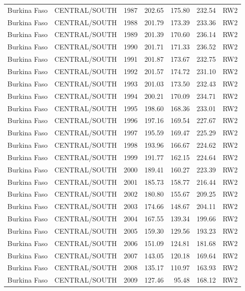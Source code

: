 \begin{longtable}{lllrrrl}
  Burkina Faso & CENTRAL/SOUTH & 1987 & 202.65 & 175.80 & 232.54 & RW2 \\ 
  Burkina Faso & CENTRAL/SOUTH & 1988 & 201.79 & 173.39 & 233.36 & RW2 \\ 
  Burkina Faso & CENTRAL/SOUTH & 1989 & 201.39 & 170.60 & 236.14 & RW2 \\ 
  Burkina Faso & CENTRAL/SOUTH & 1990 & 201.71 & 171.33 & 236.52 & RW2 \\ 
  Burkina Faso & CENTRAL/SOUTH & 1991 & 201.87 & 173.67 & 232.75 & RW2 \\ 
  Burkina Faso & CENTRAL/SOUTH & 1992 & 201.57 & 174.72 & 231.10 & RW2 \\ 
  Burkina Faso & CENTRAL/SOUTH & 1993 & 201.03 & 173.50 & 232.43 & RW2 \\ 
  Burkina Faso & CENTRAL/SOUTH & 1994 & 200.21 & 170.09 & 234.71 & RW2 \\ 
  Burkina Faso & CENTRAL/SOUTH & 1995 & 198.60 & 168.36 & 233.01 & RW2 \\ 
  Burkina Faso & CENTRAL/SOUTH & 1996 & 197.16 & 169.54 & 227.67 & RW2 \\ 
  Burkina Faso & CENTRAL/SOUTH & 1997 & 195.59 & 169.47 & 225.29 & RW2 \\ 
  Burkina Faso & CENTRAL/SOUTH & 1998 & 193.96 & 166.67 & 224.62 & RW2 \\ 
  Burkina Faso & CENTRAL/SOUTH & 1999 & 191.77 & 162.15 & 224.64 & RW2 \\ 
  Burkina Faso & CENTRAL/SOUTH & 2000 & 189.41 & 160.27 & 223.39 & RW2 \\ 
  Burkina Faso & CENTRAL/SOUTH & 2001 & 185.73 & 158.77 & 216.44 & RW2 \\ 
  Burkina Faso & CENTRAL/SOUTH & 2002 & 180.80 & 155.67 & 209.25 & RW2 \\ 
  Burkina Faso & CENTRAL/SOUTH & 2003 & 174.66 & 148.67 & 204.11 & RW2 \\ 
  Burkina Faso & CENTRAL/SOUTH & 2004 & 167.55 & 139.34 & 199.66 & RW2 \\ 
  Burkina Faso & CENTRAL/SOUTH & 2005 & 159.30 & 129.56 & 193.23 & RW2 \\ 
  Burkina Faso & CENTRAL/SOUTH & 2006 & 151.09 & 124.81 & 181.68 & RW2 \\ 
  Burkina Faso & CENTRAL/SOUTH & 2007 & 143.05 & 120.18 & 169.64 & RW2 \\ 
  Burkina Faso & CENTRAL/SOUTH & 2008 & 135.17 & 110.97 & 163.93 & RW2 \\ 
  Burkina Faso & CENTRAL/SOUTH & 2009 & 127.46 & 95.48 & 168.12 & RW2 \\ 

\end{longtable}
